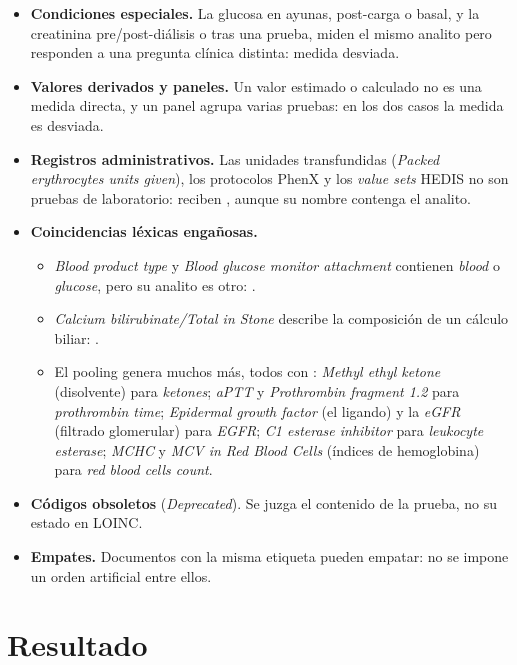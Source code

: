 \documentclass[11pt,a4paper]{article}
\begin{document}
\begin{itemize}
  paneles de gripe + SARS-CoV-2) es analito relacionado. El test de SARS-CoV de 2003 (\emph{SARS coronavirus RNA}) es otro virus: .
\item \textbf{Condiciones especiales.} La glucosa en ayunas, post-carga o basal, y la creatinina pre/post-diálisis o tras una prueba, miden el mismo
  analito pero responden a una pregunta clínica distinta: medida desviada.
\item \textbf{Valores derivados y paneles.} Un valor estimado o calculado no es una medida directa, y un panel agrupa varias pruebas: en los dos casos la medida es desviada.
\item \textbf{Registros administrativos.} Las unidades transfundidas (\emph{Packed erythrocytes units given}), los protocolos PhenX y los \emph{value sets} HEDIS
  no son pruebas de laboratorio: reciben , aunque su nombre contenga el analito.
\item \textbf{Coincidencias léxicas engañosas.}
  \begin{itemize}
  \item \emph{Blood product type} y \emph{Blood glucose monitor attachment} contienen \emph{blood} o \emph{glucose}, pero su analito es otro: .
  \item \emph{Calcium bilirubinate/Total in Stone} describe la composición de un cálculo biliar: .
  \item El pooling genera muchos más, todos con : \emph{Methyl ethyl ketone} (disolvente) para \emph{ketones};
    \emph{aPTT} y \emph{Prothrombin fragment 1.2} para \emph{prothrombin time}; \emph{Epidermal growth factor} (el ligando)
    y la \emph{eGFR} (filtrado glomerular) para \emph{EGFR}; \emph{C1 esterase inhibitor} para \emph{leukocyte esterase};
    \emph{MCHC} y \emph{MCV in Red Blood Cells} (índices de hemoglobina) para \emph{red blood cells count}.
  \end{itemize}
\item \textbf{Códigos obsoletos} (\emph{Deprecated}). Se juzga el contenido de la prueba, no su estado en LOINC.
\item \textbf{Empates.} Documentos con la misma etiqueta pueden empatar: no se impone un orden artificial entre ellos.
\end{itemize}

\section{Resultado}

\begin{table}[h]
\centering

\caption{Distribución de etiquetas por consulta, primero sobre los 67 documentos del Excel y después sobre la colección completa (1222 documentos).
$^\dagger$Consultas de la parte opcional.}
\end{table}
\end{document}
